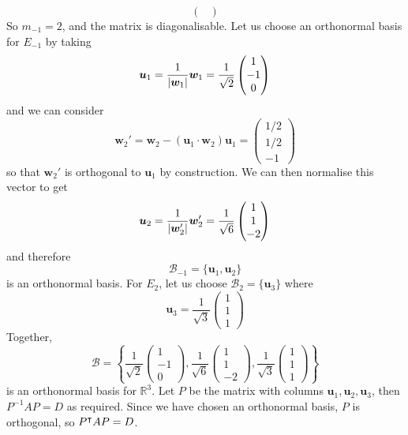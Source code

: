 \documentclass{article}
\begin{document}
\begin{enumerate}[(i)]
\[\begin{pmatrix}
		\end{pmatrix} \]
		So $m_{-1} = 2$, and the matrix is diagonalisable. Let us choose an orthonormal basis for $E_{-1}$ by taking
		\[ \bm u_1 = \frac{1}{\abs{\bm w_1}}\bm w_1 = \frac{1}{\sqrt 2}\begin{pmatrix}
			1 \\ -1 \\ 0
		\end{pmatrix} \]
		and we can consider
		\[ \bm w_2' = \bm w_2 - (\bm u_1 \cdot \bm w_2)\bm u_1 = \begin{pmatrix}
			1/2 \\ 1/2 \\ -1
		\end{pmatrix} \]
		so that $\bm w_2'$ is orthogonal to $\bm u_1$ by construction. We can then normalise this vector to get
		\[ \bm u_2 = \frac{1}{\abs{\bm w_2'}}\bm w_2' = \frac{1}{\sqrt 6} \begin{pmatrix}
			1 \\ 1 \\ -2
		\end{pmatrix} \]
		and therefore
		\[ \mathcal B_{-1} = \{ \bm u_1, \bm u_2 \} \]
		is an orthonormal basis. For $E_2$, let us choose $\mathcal B_2 = \{ \bm u_3 \}$ where
		\[ \bm u_3 = \frac{1}{\sqrt 3}\begin{pmatrix}
			1 \\ 1 \\ 1
		\end{pmatrix} \]
		Together,
		\[ \mathcal B = \left\{ \frac{1}{\sqrt 2}\begin{pmatrix}
			1 \\ -1 \\ 0
		\end{pmatrix}, \frac{1}{\sqrt 6} \begin{pmatrix}
			1 \\ 1 \\ -2
		\end{pmatrix}, \frac{1}{\sqrt 3}\begin{pmatrix}
			1 \\ 1 \\ 1
		\end{pmatrix} \right\} \]
		is an orthonormal basis for $\mathbb R^3$. Let $P$ be the matrix with columns $\bm u_1, \bm u_2, \bm u_3$, then $P^{-1}AP = D$ as required. Since we have chosen an orthonormal basis, $P$ is orthogonal, so $P^\intercal AP = D$.
	\end{enumerate}
\end{document}
